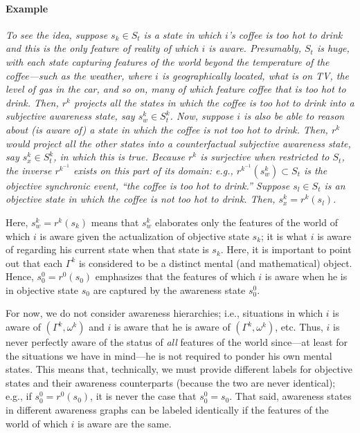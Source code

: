 \documentclass[
11pt,
titlepage,
reqno,
]{article}%
\theoremstyle{definition}
\begin{document}
\paragraph{Example} 
\emph{
	To see the idea, suppose $s_k\in S_t$ is a state in which $i$'s coffee is too hot to drink and this is the only feature of reality of which $i$ is aware.
Presumably, $S_t$ is huge, with each state capturing features of the world beyond the temperature of the coffee---such as the weather, where $i$ is geographically located, what is on TV, the level of gas in the car, and so on, many of which feature coffee that is too hot to drink.
Then, $r^k$ projects all the states in which the coffee is too hot to drink into a subjective awareness state, say $s^{k}_w\in S^k_t$. 
Now, suppose $i$ is also be able to reason about (is aware of) a state in which the coffee is not too hot to drink.
Then, $r^k$ would project all the other states into a counterfactual subjective awareness state, say $s^{k}_x\in S^k_t$, in which this is true.
Because $r^k$ is surjective when restricted to $S_t$, the inverse $r^{k^{-1}}$ exists on this part of its domain: e.g., $r^{k^{-1}}(s^{k}_w)\subset S_t$ is the objective synchronic event, ``the coffee is too hot to drink.'' 
Suppose $s_l\in S_t$ is an objective state in which the coffee is not too hot to drink. 
Then, $s^{k}_x=r^k(s_l)$.
}

Here,   $s^{k}_w=r^{k}(s_k)$ means that $s^{k}_w$ elaborates only the features of the world of which $i$ is aware given the actualization of objective state $s_k$; it is what $i$ is aware of regarding his current state when that state is $s_k$.
Here, it is important to point out that each $\Gamma^k$ is considered to be a distinct mental (and mathematical) object.
Hence, $s^0_0=r^{0}(s_0)$ emphasizes that the features of which $i$ is aware when he is in objective state $s_0$ are captured by the awareness state $s^0_0$.

For now, we do not consider awareness hierarchies; i.e., situations in which $i$ is aware of $(\Gamma^k,\omega^k)$ and $i$ is aware that he is aware of $(\Gamma^k,\omega^k)$, etc.
Thus, $i$ is never perfectly aware of the status of \textit{all} features of the world since---at least for the situations we have in mind---he is not required to ponder his own mental states.
This means that, technically, we must provide different labels for objective states and their awareness counterparts (because the two are never identical); e.g., if $s^{0}_0=r^{0}(s_0)$, it is never the case that $s^{0}_0=s_0$.
That said, awareness states in different awareness graphs can be labeled identically if the features of the world of which $i$ is aware are the same.
\end{document}

